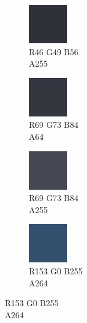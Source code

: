 \begin{figure}[h]\label{gui-colors}
	\centering
	\captionsetup{justification=centering}
	\begin{subfigure}{0.105\textwidth}
		\centering
		\includegraphics[scale=1, frame]{gui-imgs/R46G49B56A255}
		\vspace*{-20px}\caption*{\hspace*{-0.25px}\tiny R46 G49 B56 \\ \tiny A255}
	\end{subfigure}
	\begin{subfigure}{0.105\textwidth}
		\centering
		\includegraphics[scale=1, frame]{gui-imgs/R69G73B84A64}
		\vspace*{-20px}\caption*{\hspace*{-0.25px}\tiny R69 G73 B84 \\ \tiny A64}
	\end{subfigure}
	\begin{subfigure}{0.105\textwidth}
		\centering
		\includegraphics[scale=1, frame]{gui-imgs/R69G73B84A255}
		\vspace*{-20px}\caption*{\hspace*{-0.25px}\tiny R69 G73 B84 \\ \tiny A255}
	\end{subfigure}
 	\begin{subfigure}{0.105\textwidth}
		\centering
		\includegraphics[scale=1, frame]{gui-imgs/R51G153B255A64}
		\vspace*{-20px} \caption*{\hspace*{-0.25px}\tiny R153 G0 B255 \\ \tiny A264}
	\end{subfigure}

\end{figure}
